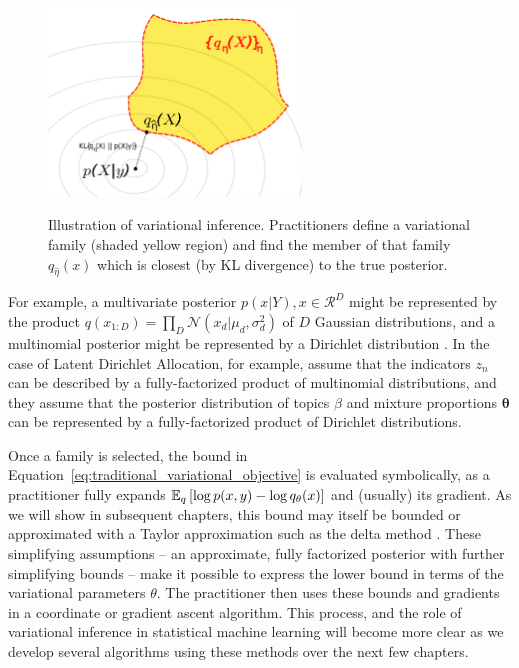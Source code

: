 \begin{figure}
  \center
  \includegraphics[width=0.6\textwidth]{chapter_introductory_material/figs/variational_family.pdf}
  \label{fig:variational_inference}
  \caption{Illustration of variational inference.  Practitioners
    define a variational family (shaded yellow region) and find the
    member of that family $q_{\hat \eta}(x)$ which is closest (by KL
    divergence) to the true posterior.}
\end{figure}
For example, a multivariate posterior $p(x | Y), x \in \mathcal{R}^D$
might be represented by the product $q(x_{1:D}) = \prod_D
\mathcal{N}(x_d | \mu_d, \sigma_d^2)$ of $D$ Gaussian distributions,
and a multinomial posterior might be represented by a Dirichlet
distribution \citep{bishop:2006}.  In the case of Latent Dirichlet
Allocation, for example, \cite{blei:2003} assume that the indicators
$z_n$ can be described by a fully-factorized product of multinomial
distributions, and they assume that the posterior distribution of
topics $\beta$ and mixture proportions $\bm \theta$ can be represented by
a fully-factorized product of Dirichlet distributions.

Once a family is selected, the bound in
Equation~\ref{eq:traditional_variational_objective} is evaluated
symbolically, as a practitioner fully expands $\mathbb{E}_q\left[ \log p(x, y)
  - \log q_\theta(x)\right]$ and (usually) its gradient. As we will show in
subsequent chapters, this bound may itself be bounded or approximated
with a Taylor approximation such as the delta method
\citep{bickel:2007,braun:2007}. These simplifying assumptions -- an
approximate, fully factorized posterior with further simplifying
bounds -- make it possible to express the lower bound in terms of the
variational parameters $\theta$.  The practitioner then uses these
bounds and gradients in a coordinate or gradient ascent algorithm.
This process, and the role of variational inference in statistical
machine learning will become more clear as we develop several
algorithms using these methods over the next few chapters.


